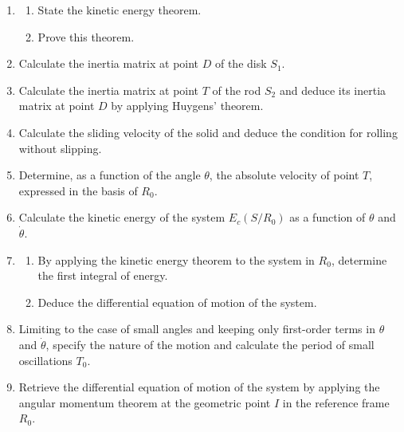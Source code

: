 \documentclass[12pt]{article}
\begin{document}
\begin{enumerate}
    \item 
    \begin{enumerate}
        \item State the kinetic energy theorem.
        \item Prove this theorem.
    \end{enumerate}
    
    \item Calculate the inertia matrix at point \( D \) of the disk \( S_1 \).
    
    \item Calculate the inertia matrix at point \( T \) of the rod \( S_2 \) and deduce its inertia matrix at point \( D \) by applying Huygens' theorem.
    
    \item Calculate the sliding velocity of the solid and deduce the condition for rolling without slipping.
    
    \item Determine, as a function of the angle \( \theta \), the absolute velocity of point \( T \), expressed in the basis of \( R_0 \).
    
    \item Calculate the kinetic energy of the system \( E_c (S/R_0) \) as a function of \( \theta \) and \( \dot{\theta} \).
    
    \item 
    \begin{enumerate}
        \item By applying the kinetic energy theorem to the system in \( R_0 \), determine the first integral of energy.
        \item Deduce the differential equation of motion of the system.
    \end{enumerate}
    
    \item Limiting to the case of small angles and keeping only first-order terms in \( \theta \) and \( \dot{\theta} \), specify the nature of the motion and calculate the period of small oscillations \( T_0 \).
    
    \item Retrieve the differential equation of motion of the system by applying the angular momentum theorem at the geometric point \( I \) in the reference frame \( R_0 \).
\end{enumerate}

\newpage
\end{document}
